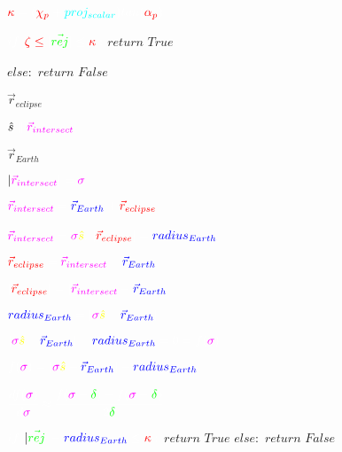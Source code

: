 \documentclass{article}
\begin{document}
\begin{center}
{$
\color{red}\kappa
\color{white}=(
\color{red}\chi_p
\color{white}+
\color{cyan}proj_{scalar}
\color{white})tan(
\color{red}\alpha_p\color{white})
$

$
\color{white}if$ $
\color{red}\zeta\leq\color{white}|
\color{green}\vec{rej}
\color{white}| \leq
\color{red}\kappa
\color{white}:$ $return$ $True$

$else:$ $return$ $False$


\color{red}$\vec{r}_{eclipse}$

\color{yellow}$
\hat{s}
\color{white}\parallel
\color{magenta}\vec{r}_{intersect}$

\color{blue}$\vec{r}_{Earth}$

\color{white}$|
\color{magenta}\vec{r}_{intersect}
\color{white}|=
\color{magenta}\sigma$

$
\color{magenta}\vec{r}_{intersect}
\color{white}=
\color{blue}\vec{r}_{Earth}
\color{white}+
\color{red}\vec{r}_{eclipse}
$

$
\color{magenta}\vec{r}_{intersect}
\color{white}=
\color{magenta}\sigma
\color{yellow}\hat{s}
\color{white},$   $
\color{white}|
\color{red}\vec{r}_{eclipse}
\color{white}|=
\color{blue}radius_{Earth}
$

$
\color{red}\vec{r}_{eclipse}
\color{white}=
\color{magenta}\vec{r}_{intersect}
\color{white}-
\color{blue}\vec{r}_{Earth}
$

$
\color{white}|
\color{red}\vec{r}_{eclipse}
\color{white}|=|
\color{magenta}\vec{r}_{intersect}
\color{white}-
\color{blue}\vec{r}_{Earth}
\color{white}|
$

$
\color{blue}radius_{Earth}
\color{white}=|
\color{magenta}\sigma
\color{yellow}\hat{s}
\color{white}-
\color{blue}\vec{r}_{Earth}
\color{white}|
$

$
\color{white}|
\color{magenta}\sigma
\color{yellow}\hat{s}
\color{white}-
\color{blue}\vec{r}_{Earth}
\color{white}|-
\color{blue}radius_{Earth}
\color{white}=0=f(
\color{magenta}\sigma
\color{white})
$



$
\color{white}f(
\color{magenta}\sigma
\color{white})=|
\color{magenta}\sigma
\color{yellow}\hat{s}
\color{white}-
\color{blue}\vec{r}_{Earth}
\color{white}|-
\color{blue}radius_{Earth}
$

$
\color{white}\cfrac{df(
\color{magenta}\sigma
\color{white})}{d\color{magenta}\sigma\color{white}}\approx
\cfrac{f(\color{magenta}\sigma \color{white}+\color{green}\delta
\color{white})-
f(\color{magenta}\sigma \color{white}-\color{green}\delta
\color{white})}{2\color{green}\delta}
$

$
\color{white}if$ $|
\color{green}\vec{rej}
\color{white}|-
\color{blue}radius_{Earth}
\color{white}\leq
\color{red}\kappa
\color{white}:$ $return$ $True$
$else:$ $return$ $False$

}\end{center}
\end{document}
